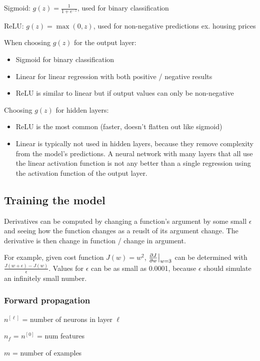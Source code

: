 \documentclass[12pt]{article}
\begin{document}
Sigmoid: $g(z) = \frac{1}{1 + e^{-z}}$, used for binary classification

ReLU: $g(z) = \max(0, z)$, used for non-negative predictions ex. housing prices

When choosing $g(z)$ for the output layer:
\begin{itemize}
    \item Sigmoid for binary classification
    \item Linear for linear regression with both positive / negative results
    \item ReLU is similar to linear but if output values can only be non-negative
\end{itemize}

Choosing $g(z)$ for hidden layers:
\begin{itemize}
    \item ReLU is the most common (faster, doesn't flatten out like sigmoid)
    \item Linear is typically not used in hidden layers, because they remove complexity
        from the model's predictions. A neural network with many layers that all use
        the linear activation function is not any better than a single regression
        using the activation function of the output layer.
\end{itemize}

\subsection{Training the model}

Derivatives can be computed by changing a function's argument by some small $\epsilon$ and
seeing how the function changes as a reuslt of its argument change. The derivative is then
change in function / change in argument.

For example, given cost function $J(w) = w^2$, $\frac{\partial J}{\partial w}\big{|}_{w=3}$
can be determined with $\frac{J(w + \epsilon) - J(w)}{\epsilon}$. Values for $\epsilon$
can be as small as 0.0001, because $\epsilon$ should simulate an infinitely small number.

\subsubsection{Forward propagation}
$n^{[\ell]}$ = number of neurons in layer $\ell$

$n_f$ = $n^{[0]}$ = num features

$m$ = number of examples
\end{document}

